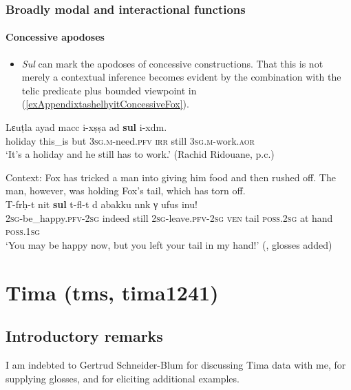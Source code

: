 \subsubsection{Broadly modal and interactional functions}
\paragraph{Concessive apodoses}
\label{appendixTashelhyitConcessiveConsequent}
\begin{itemize}
	\item \textit{Sul} can mark the apodoses of concessive constructions. That this is not merely a contextual inference becomes evident by the combination with the telic predicate plus bounded viewpoint in (\ref{exAppendixtashelhyitConcessiveFox}).
\end{itemize}

\begin{exe}
	\ex
	\gll Lɛuṭla ayad macc i-xṣṣa ad \textbf{sul} i-xdm.\\
	holiday this\_is but 3\textsc{sg}.\textsc{m}-need.\textsc{pfv} \textsc{irr} still 3\textsc{sg}.\textsc{m}-work.\textsc{aor}\\
	\glt \lq It's a holiday and he still has to work.' (Rachid Ridouane, p.c.)

	\ex\label{exAppendixtashelhyitConcessiveFox}
	Context: Fox has tricked a man into giving him food and then rushed off. The man, however, was holding Fox’s tail, which has torn off.\\
	\gll T-frḥ-t nit \textbf{sul} t-fl-t d abakku nnk γ ufus inu!\\
	2\textsc{sg}-be\_happy.\textsc{pfv}-2\textsc{sg} indeed still 2\textsc{sg}-leave.\textsc{pfv}-2\textsc{sg} \textsc{ven} tail \textsc{poss}.2\textsc{sg} at hand \textsc{poss}.1\textsc{sg}\\
	\glt \lq You may be happy now, but you left your tail in my hand!' (\cite[82]{Stroomer2001}, glosses added)
\end{exe}
\section{Tima (tms, tima1241)}\label{appendixtima}
\subsection{Introductory remarks}
I am indebted to Gertrud Schneider-Blum for discussing Tima data with me, for supplying glosses, and for eliciting additional examples.

